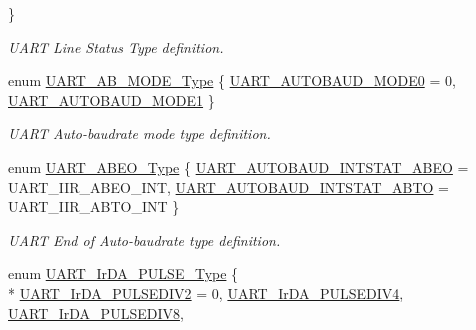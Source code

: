\begin{DoxyCompactItemize}
 \}\begin{DoxyCompactList}\small\item\em U\+A\+RT Line Status Type definition. \end{DoxyCompactList}
\item 
enum \hyperlink{group___u_a_r_t___public___types_ga0a6689108a4f3651d2188ea8a2c17d4a}{U\+A\+R\+T\+\_\+\+A\+B\+\_\+\+M\+O\+D\+E\+\_\+\+Type} \{ \hyperlink{group___u_a_r_t___public___types_gga0a6689108a4f3651d2188ea8a2c17d4aabc4d62d047a6bc05fc2642091508c97a}{U\+A\+R\+T\+\_\+\+A\+U\+T\+O\+B\+A\+U\+D\+\_\+\+M\+O\+D\+E0} = 0, 
\hyperlink{group___u_a_r_t___public___types_gga0a6689108a4f3651d2188ea8a2c17d4aae7ac1b0008b5c99529b71d970969761f}{U\+A\+R\+T\+\_\+\+A\+U\+T\+O\+B\+A\+U\+D\+\_\+\+M\+O\+D\+E1}
 \}\begin{DoxyCompactList}\small\item\em U\+A\+RT Auto-\/baudrate mode type definition. \end{DoxyCompactList}
\item 
enum \hyperlink{group___u_a_r_t___public___types_ga85f8df03cce76ca8e9404364a3b68487}{U\+A\+R\+T\+\_\+\+A\+B\+E\+O\+\_\+\+Type} \{ \hyperlink{group___u_a_r_t___public___types_gga85f8df03cce76ca8e9404364a3b68487a7e069f3443610ab3ea485eeb60927541}{U\+A\+R\+T\+\_\+\+A\+U\+T\+O\+B\+A\+U\+D\+\_\+\+I\+N\+T\+S\+T\+A\+T\+\_\+\+A\+B\+EO} = U\+A\+R\+T\+\_\+\+I\+I\+R\+\_\+\+A\+B\+E\+O\+\_\+\+I\+NT, 
\hyperlink{group___u_a_r_t___public___types_gga85f8df03cce76ca8e9404364a3b68487a22d6547b0202ba587cea84a30ad41668}{U\+A\+R\+T\+\_\+\+A\+U\+T\+O\+B\+A\+U\+D\+\_\+\+I\+N\+T\+S\+T\+A\+T\+\_\+\+A\+B\+TO} = U\+A\+R\+T\+\_\+\+I\+I\+R\+\_\+\+A\+B\+T\+O\+\_\+\+I\+NT
 \}\begin{DoxyCompactList}\small\item\em U\+A\+RT End of Auto-\/baudrate type definition. \end{DoxyCompactList}
\item 
enum \hyperlink{group___u_a_r_t___public___types_ga2e41fe7d668367ce455940f7dfde1d92}{U\+A\+R\+T\+\_\+\+Ir\+D\+A\+\_\+\+P\+U\+L\+S\+E\+\_\+\+Type} \{ \\*
\hyperlink{group___u_a_r_t___public___types_gga2e41fe7d668367ce455940f7dfde1d92ad0cefa4f2f3e4573e123c3f3479bb139}{U\+A\+R\+T\+\_\+\+Ir\+D\+A\+\_\+\+P\+U\+L\+S\+E\+D\+I\+V2} = 0, 
\hyperlink{group___u_a_r_t___public___types_gga2e41fe7d668367ce455940f7dfde1d92a71f627b0056af2048e3c2b58c8de5910}{U\+A\+R\+T\+\_\+\+Ir\+D\+A\+\_\+\+P\+U\+L\+S\+E\+D\+I\+V4}, 
\hyperlink{group___u_a_r_t___public___types_gga2e41fe7d668367ce455940f7dfde1d92adfbe55864dea0b5a610ba59f014148f7}{U\+A\+R\+T\+\_\+\+Ir\+D\+A\+\_\+\+P\+U\+L\+S\+E\+D\+I\+V8}, 

\end{DoxyCompactItemize}
